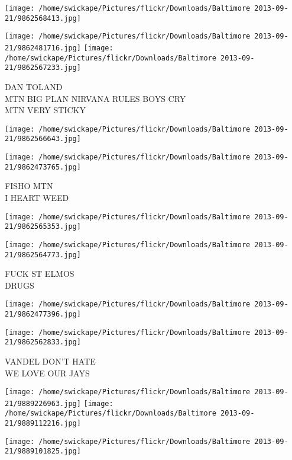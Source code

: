 \documentclass[10pt,letterpaper]{article}
\begin{document}
\texttt{[image: /home/swickape/Pictures/flickr/Downloads/Baltimore 2013-09-21/9862568413.jpg]}

\vspace{0.25in}
\texttt{[image: /home/swickape/Pictures/flickr/Downloads/Baltimore 2013-09-21/9862481716.jpg]}
\texttt{[image: /home/swickape/Pictures/flickr/Downloads/Baltimore 2013-09-21/9862567233.jpg]}

DAN TOLAND\\
MTN BIG PLAN NIRVANA RULES BOYS CRY\\
MTN VERY STICKY\\
\pagebreak

\texttt{[image: /home/swickape/Pictures/flickr/Downloads/Baltimore 2013-09-21/9862566643.jpg]}

\vspace{0.25in}
\texttt{[image: /home/swickape/Pictures/flickr/Downloads/Baltimore 2013-09-21/9862473765.jpg]}

FISHO MTN\\
I HEART WEED\\
\pagebreak

\texttt{[image: /home/swickape/Pictures/flickr/Downloads/Baltimore 2013-09-21/9862565353.jpg]}

\vspace{0.25in}
\texttt{[image: /home/swickape/Pictures/flickr/Downloads/Baltimore 2013-09-21/9862564773.jpg]}

FUCK ST ELMOS\\
DRUGS\\
\pagebreak

\texttt{[image: /home/swickape/Pictures/flickr/Downloads/Baltimore 2013-09-21/9862477396.jpg]}

\vspace{0.25in}
\texttt{[image: /home/swickape/Pictures/flickr/Downloads/Baltimore 2013-09-21/9862562833.jpg]}

VANDEL DON'T HATE\\
WE LOVE OUR JAYS\\
\pagebreak

\texttt{[image: /home/swickape/Pictures/flickr/Downloads/Baltimore 2013-09-21/9889226963.jpg]}
\texttt{[image: /home/swickape/Pictures/flickr/Downloads/Baltimore 2013-09-21/9889112216.jpg]}

\vspace{0.25in}
\texttt{[image: /home/swickape/Pictures/flickr/Downloads/Baltimore 2013-09-21/9889101825.jpg]}
\end{document}
